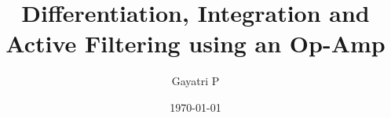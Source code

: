 \documentclass[reprint,amsmath,amssymb,aps, margin=1in]{revtex4-2}
\begin{document}
    \title{Differentiation, Integration and Active Filtering using an Op-Amp}

    \author{Gayatri P}
    \date{\today}

    
    \maketitle

    
    
    
    

    \appendix

    

    
    \nocite{*}
\end{document}
